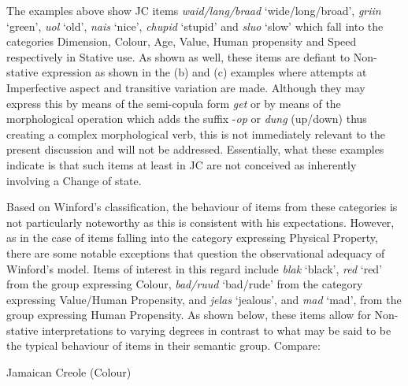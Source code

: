 \z

The examples  above show JC items \textit{waid\slash lang\slash braad}
`wide\slash long\slash broad', \textit{griin} `green', \textit{uol} `old',
\textit{nais} `nice', \textit{chupid} `stupid' and \textit{sluo} `slow'
which fall into the categories Dimension, Colour, Age, Value, Human
propensity and Speed respectively in Stative use.  As shown as well,
these items are defiant to Non-stative expression as shown in the (b)
and (c) examples where attempts at Imperfective aspect and transitive
variation are made.  Although they may express this by means of the
semi-copula form \textit{get} or by means of the morphological
operation which adds the suffix -\textit{op} or \textit{dung}
  (up\slash down) thus creating a complex morphological verb, this is not
immediately relevant to the present discussion and will not be
addressed.  Essentially, what these examples indicate is that such
items at least in JC are not conceived as inherently involving a
Change of state.

Based on Winford’s classification, the behaviour of items from these
categories is not particularly noteworthy as this is consistent with
his expectations.  However, as in the case of items falling into the
category expressing Physical Property, there are some notable
exceptions that question the observational adequacy of Winford’s
model.  Items of interest in this regard include \textit{blak}
`black', \textit{red} `red' from the group expressing Colour,
\textit{bad/ruud} `bad\slash rude' from the category expressing Value\slash Human
Propensity, and \textit{jelas} `jealous', and \textit{mad} `mad', from
the group expressing Human Propensity.  As shown below, these items
allow for Non-stative interpretations to varying degrees in contrast
to what may be said to be the typical behaviour of items in their semantic group. 
Compare:

\ea%
\label{ex:3:28}
Jamaican Creole (Colour) \\


 \z \z

